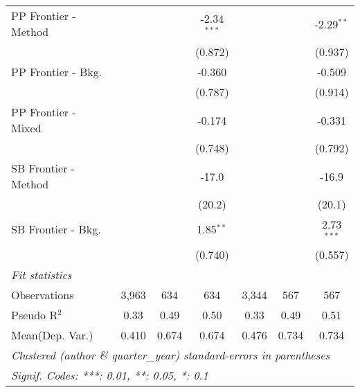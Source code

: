 \begin{tabular}{lcccccc}
   PP Frontier - Method &         &         & -2.34$^{***}$ &         &             & -2.29$^{**}$\\   
                        &         &         & (0.872)       &         &             & (0.937)\\   
   PP Frontier - Bkg.   &         &         & -0.360        &         &             & -0.509\\   
                        &         &         & (0.787)       &         &             & (0.914)\\   
   PP Frontier - Mixed  &         &         & -0.174        &         &             & -0.331\\   
                        &         &         & (0.748)       &         &             & (0.792)\\   
   SB Frontier - Method &         &         & -17.0         &         &             & -16.9\\   
                        &         &         & (20.2)        &         &             & (20.1)\\   
   SB Frontier - Bkg.   &         &         & 1.85$^{**}$   &         &             & 2.73$^{***}$\\   
                        &         &         & (0.740)       &         &             & (0.557)\\   
   \midrule
   \emph{Fit statistics}\\
   Observations         & 3,963   & 634     & 634           & 3,344   & 567         & 567\\  
   Pseudo R$^2$         & 0.33    & 0.49    & 0.50          & 0.33    & 0.49        & 0.51\\  
Mean(Dep. Var.) & 0.410 & 0.674 & 0.674 & 0.476 & 0.734 & 0.734 \\
   \midrule \midrule
   \multicolumn{7}{l}{\emph{Clustered (author \& quarter\_year) standard-errors in parentheses}}\\
   \multicolumn{7}{l}{\emph{Signif. Codes: ***: 0.01, **: 0.05, *: 0.1}}\\
\end{tabular}
\par\endgroup
